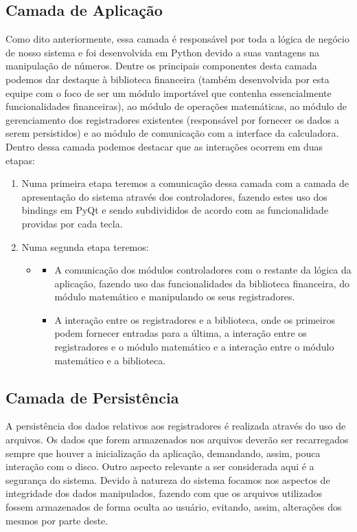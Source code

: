 \subsection{Camada de Aplicação}
Como dito anteriormente, essa camada é responsável por toda a lógica de negócio de nosso sistema e foi desenvolvida em Python devido a suas vantagens na manipulação de números.
Dentre os principais componentes desta camada podemos dar destaque à biblioteca financeira (também desenvolvida por esta equipe com o foco de ser um módulo importável que contenha essencialmente funcionalidades financeiras), ao módulo de operações matemáticas, ao módulo de gerenciamento dos registradores existentes (responsável por fornecer os dados a serem persistidos) e ao módulo de comunicação com a interface da calculadora.
 Dentro dessa camada podemos destacar que as interações ocorrem em duas etapas:
\begin{enumerate}
 \item Numa primeira etapa teremos a comunicação dessa camada com a camada de apresentação do sistema através dos controladores, fazendo estes uso dos bindings em PyQt e sendo subdivididos de acordo com as funcionalidade providas por cada tecla.
 \item Numa segunda etapa teremos:	
 \begin{itemize}
  \item \begin{itemize}
         \item A comunicação dos módulos controladores com o restante da lógica da aplicação, fazendo uso das funcionalidades da biblioteca financeira, do módulo matemático e manipulando os seus registradores.
	 \item A interação entre os registradores e a biblioteca, onde os primeiros podem fornecer entradas para a última, a interação entre os registradores e o módulo matemático e a interação entre o módulo matemático e a biblioteca.
        \end{itemize}
 \end{itemize}
\end{enumerate}

\subsection{Camada de Persistência}
A persistência dos dados relativos aos registradores é realizada através do uso de arquivos. Os dados que forem armazenados nos arquivos deverão ser recarregados sempre que houver a inicialização da aplicação, demandando, assim, pouca interação com o disco.
Outro aspecto relevante a ser considerada aqui é a segurança do sistema.  Devido à natureza do sistema focamos nos aspectos de integridade dos dados manipulados, fazendo com que os arquivos utilizados fossem armazenados de forma oculta ao usuário, evitando, assim, alterações dos mesmos por parte deste.


